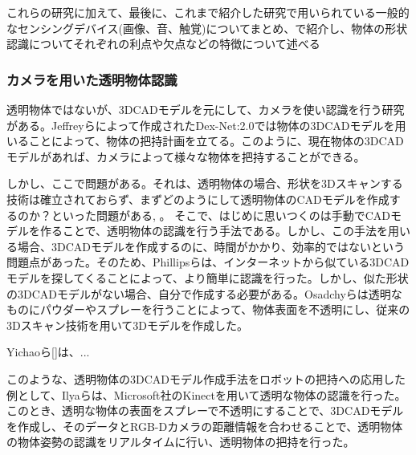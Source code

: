 これらの研究に加えて、最後に、これまで紹介した研究で用いられている一般的なセンシングデバイス(画像、音、触覚)についてまとめ、で紹介し、物体の形状認識についてそれぞれの利点や欠点などの特徴について述べる


\subsubsection{カメラを用いた透明物体認識}
\label{sec:related_work_camera}
透明物体ではないが、3DCADモデルを元にして、カメラを使い認識を行う研究がある。Jeffreyら\cite{jeffrey2017dex-net2}によって作成されたDex-Net:2.0では物体の3DCADモデルを用いることによって、物体の把持計画を立てる。このように、現在物体の3DCADモデルがあれば、カメラによって様々な物体を把持することができる。

しかし、ここで問題がある。それは、透明物体の場合、形状を3Dスキャンする技術は確立されておらず、まずどのようにして透明物体のCADモデルを作成するのか？といった問題がある\cite{fabrice2012transparent3d},\cite{Ihrke2008stateof} 。
そこで、はじめに思いつくのは手動でCADモデルを作ることで、透明物体の認識を行う手法である。しかし、この手法を用いる場合、3DCADモデルを作成するのに、時間がかかり、効率的ではないという問題点があった。そのため、Phillipsら\cite{phillips20113dcadinternet}は、インターネットから似ている3DCADモデルを探してくることによって、より簡単に認識を行った。しかし、似た形状の3DCADモデルがない場合、自分で作成する必要がある。Osadchyら\cite{osadchy20033dcadsplay}は透明なものにパウダーやスプレーを行うことによって、物体表面を不透明にし、従来の3Dスキャン技術を用いて3Dモデルを作成した。

Yichaoら[]は、...
\fi

このような、透明物体の3DCADモデル作成手法をロボットの把持への応用した例として、Ilyaら\cite{iiya2013transparent}は、Microsoft社のKinectを用いて透明な物体の認識を行った。このとき、透明な物体の表面をスプレーで不透明にすることで、3DCADモデルを作成し、そのデータとRGB-Dカメラの距離情報を合わせることで、透明物体の物体姿勢の認識をリアルタイムに行い、透明物体の把持を行った。


